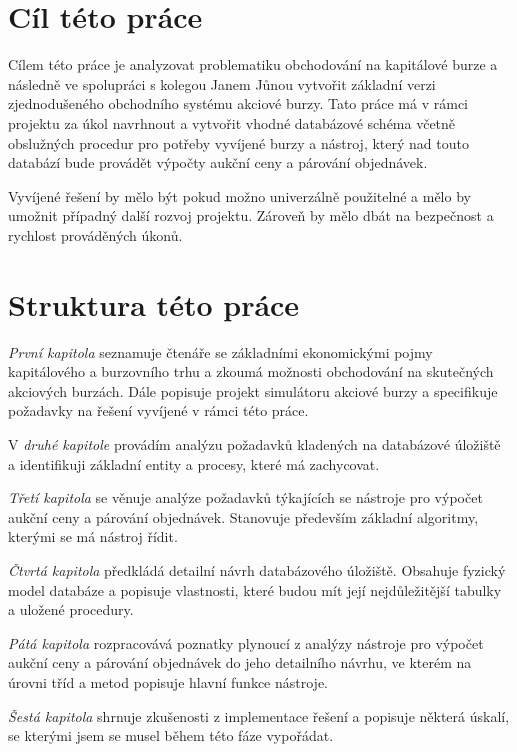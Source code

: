 \documentclass[thesis=M,czech]{FITthesis}[2012/06/26]
\begin{document}
\begin{introduction}
	
\section{Cíl této práce}

Cílem této práce je analyzovat problematiku obchodování na kapitálové burze a následně ve spolupráci 
s kolegou Janem Jůnou vytvořit základní verzi zjednodušeného obchodního systému akciové burzy. 
Tato práce má v rámci projektu za úkol navrhnout a vytvořit vhodné databázové schéma včetně 
obslužných procedur pro potřeby vyvíjené burzy a nástroj, který nad touto databází bude provádět 
výpočty aukční ceny a párování objednávek.

Vyvíjené řešení by mělo být pokud možno univerzálně použitelné a mělo by umožnit případný další 
rozvoj projektu. Zároveň by mělo dbát na bezpečnost a rychlost prováděných úkonů.

	
\section{Struktura této práce}

\textit{První kapitola} seznamuje čtenáře se základními ekonomickými pojmy kapitálového a burzovního trhu 
a zkoumá možnosti obchodování na skutečných akciových burzách. Dále popisuje projekt simulátoru akciové 
burzy a specifikuje požadavky na řešení vyvíjené v rámci této práce.

V \textit{druhé kapitole} provádím analýzu požadavků kladených na databázové úložiště a identifikuji základní 
entity a procesy, které má zachycovat.

\textit{Třetí kapitola} se věnuje analýze požadavků týkajících se nástroje pro výpočet aukční ceny a 
párování objednávek. Stanovuje především základní algoritmy, kterými se má nástroj řídit.

\textit{Čtvrtá kapitola} předkládá detailní návrh databázového úložiště. Obsahuje fyzický model databáze a 
popisuje vlastnosti, které budou mít její nejdůležitější tabulky a uložené procedury.

\textit{Pátá kapitola} rozpracovává poznatky plynoucí z analýzy nástroje pro výpočet aukční ceny a párování 
objednávek do jeho detailního návrhu, ve kterém na úrovni tříd a metod popisuje hlavní funkce nástroje.

\textit{Šestá kapitola} shrnuje zkušenosti z implementace řešení a popisuje některá úskalí, se kterými jsem 
se musel během této fáze vypořádat.


\end{introduction}
\end{document}
